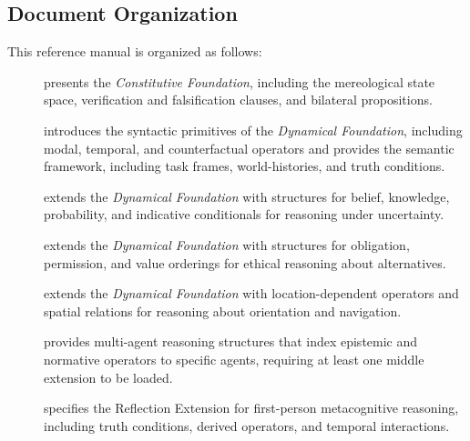 \documentclass[../LogosReference.tex]{subfiles}
\begin{document}

\subsection{Document Organization}\label{sec:document-organization}

This reference manual is organized as follows:


\begin{description}
	\item[] presents the \textit{Constitutive Foundation}, including the mereological state space, verification and falsification clauses, and bilateral propositions.

	\item[] introduces the syntactic primitives of the \textit{Dynamical Foundation}, including modal, temporal, and counterfactual operators and provides the semantic framework, including task frames, world-histories, and truth conditions.

	\item[] extends the \textit{Dynamical Foundation} with structures for belief, knowledge, probability, and indicative conditionals for reasoning under uncertainty.

	\item[] extends the \textit{Dynamical Foundation} with structures for obligation, permission, and value orderings for ethical reasoning about alternatives.

	\item[] extends the \textit{Dynamical Foundation} with location-dependent operators and spatial relations for reasoning about orientation and navigation.

	\item[] provides multi-agent reasoning structures that index epistemic and normative operators to specific agents, requiring at least one middle extension to be loaded.

	\item[] specifies the Reflection Extension for first-person metacognitive reasoning, including truth conditions, derived operators, and temporal interactions.
\end{description}
\end{document}
